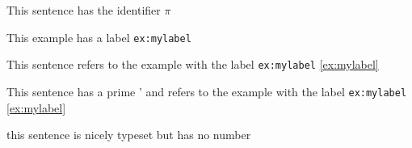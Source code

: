 \begin{exe}
 \exi{$\pi$} This sentence has the identifier $\pi$
\end{exe}

\begin{exe}
 \ex \label{ex:mylabel} This example has a label \texttt{ex:mylabel}
\end{exe}

\begin{exe}
  This sentence refers to the example with the label \texttt{ex:mylabel} \ref{ex:mylabel}
\end{exe}

\begin{exe}
  This sentence has a prime ' and refers to  the example with the label \texttt{ex:mylabel} \ref{ex:mylabel}
\end{exe}

\begin{exe}
 \sn this sentence is nicely typeset but has no number
\end{exe}
